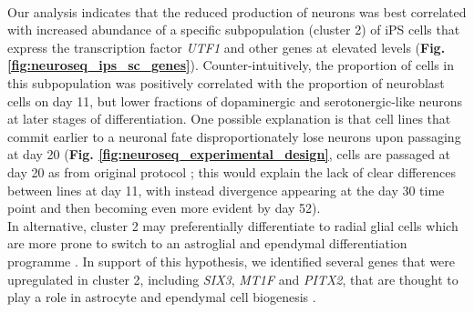 \\

Our analysis indicates that the reduced production of neurons was best correlated with increased abundance of a specific subpopulation (cluster 2) of iPS cells that express the transcription factor \textit{UTF1} and other genes at elevated levels (\textbf{Fig. \ref{fig:neuroseq_ips_sc_genes}}).
Counter-intuitively, the proportion of cells in this subpopulation was positively correlated with the proportion of neuroblast cells on day 11, but lower fractions of dopaminergic and serotonergic-like neurons at later stages of differentiation. 
One possible explanation is that cell lines that commit earlier to a neuronal fate disproportionately lose neurons upon passaging at day 20 (\textbf{Fig. \ref{fig:neuroseq_experimental_design}}, cells are passaged at day 20 as from original protocol \cite{kriks2011dopamine}; this would explain the lack of clear differences between lines at day 11, with instead divergence appearing at the day 30 time point and then becoming even more evident by day 52).
\\

In alternative, cluster 2 may preferentially differentiate to radial glial cells which are more prone to switch to an astroglial and ependymal differentiation programme \cite{spassky2005adult}. 
In support of this hypothesis, we identified several genes that were upregulated in cluster 2, including \textit{SIX3}, \textit{MT1F} and \textit{PITX2}, that are thought to play a role in astrocyte and ependymal cell biogenesis \cite{lavado2011six3, michael2011up, jacquet2009foxj1}. \\





